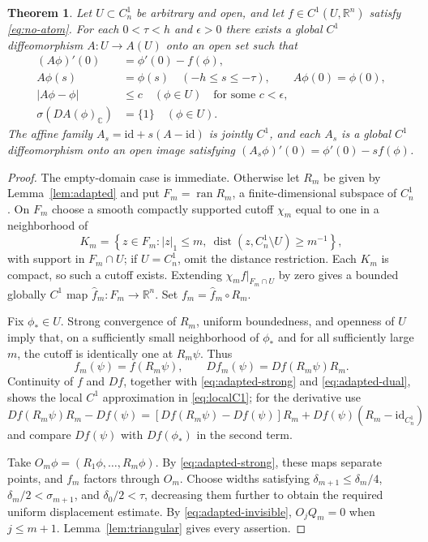 \documentclass[11pt]{article}
\newtheorem{theorem}{Theorem}[section]
\newcommand{\id}{\mathrm{id}}
\newcommand{\ran}{\operatorname{ran}}
\newcommand{\dist}{\operatorname{dist}}
\begin{document}
\begin{theorem}\label{thm:no-atom}
Let $U\subset C_n^1$ be arbitrary and open, and let $f\in C^1(U,\mathbb R^n)$ satisfy \eqref{eq:no-atom}. For each $0<\tau<h$ and $\epsilon>0$ there exists a global $C^1$ diffeomorphism $A:U\to A(U)$ onto an open set such that
\begin{align*}
 (A\phi)'(0)&=\phi'(0)-f(\phi),\\
 A\phi(s)&=\phi(s)\quad(-h\le s\le-\tau),\qquad A\phi(0)=\phi(0),\\
 |A\phi-\phi|&\le c\quad(\phi\in U)\quad\text{for some }c<\epsilon,\\
 \sigma(DA(\phi)_{\mathbb C})&=\{1\}\quad(\phi\in U).
\end{align*}
The affine family $A_s=\id+s(A-\id)$ is jointly $C^1$, and each $A_s$ is a global $C^1$ diffeomorphism onto an open image satisfying $(A_s\phi)'(0)=\phi'(0)-sf(\phi)$.
\end{theorem}
\begin{proof}
The empty-domain case is immediate. Otherwise let $R_m$ be given by Lemma~\ref{lem:adapted} and put $F_m=\ran R_m$, a finite-dimensional subspace of $C_n^1$. On $F_m$ choose a smooth compactly supported cutoff $\chi_m$ equal to one in a neighborhood of
\[
 K_m=\left\{z\in F_m:|z|_1\le m,
   \ \dist(z,C_n^1\setminus U)\ge m^{-1}\right\},
\]
with support in $F_m\cap U$; if $U=C_n^1$, omit the distance restriction. Each $K_m$ is compact, so such a cutoff exists. Extending $\chi_m f|_{F_m\cap U}$ by zero gives a bounded globally $C^1$ map $\widehat f_m:F_m\to\mathbb R^n$. Set $f_m=\widehat f_m\circ R_m$.

Fix $\phi_*\in U$. Strong convergence of $R_m$, uniform boundedness, and openness of $U$ imply that, on a sufficiently small neighborhood of $\phi_*$ and for all sufficiently large $m$, the cutoff is identically one at $R_m\psi$. Thus
\[
 f_m(\psi)=f(R_m\psi),\qquad
 Df_m(\psi)=Df(R_m\psi)R_m.
\]
Continuity of $f$ and $Df$, together with \eqref{eq:adapted-strong} and \eqref{eq:adapted-dual}, shows the local $C^1$ approximation in \eqref{eq:localC1}; for the derivative use
\[
 Df(R_m\psi)R_m-Df(\psi)
 =[Df(R_m\psi)-Df(\psi)]R_m
 +Df(\psi)(R_m-\id_{C_n^1})
\]
and compare $Df(\psi)$ with $Df(\phi_*)$ in the second term.

Take $O_m\phi=(R_1\phi,\ldots,R_m\phi)$.
By \eqref{eq:adapted-strong}, these maps separate
points, and $f_m$ factors through $O_m$.
Choose widths satisfying
$\delta_{m+1}\le\delta_m/4$,
$\delta_m/2<\sigma_{m+1}$, and
$\delta_0/2<\tau$, decreasing them further
to obtain the required uniform displacement
estimate. By \eqref{eq:adapted-invisible},
$O_jQ_m=0$ when $j\le m+1$.
Lemma~\ref{lem:triangular} gives every assertion.
\end{proof}
\end{document}
